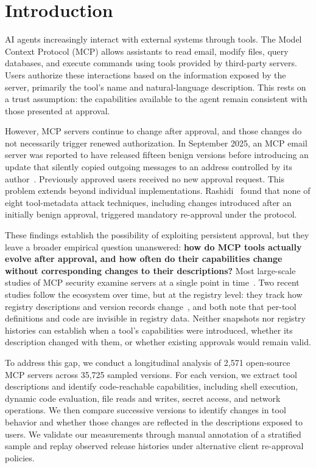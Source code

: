 \section{Introduction}\label{sec:intro}

AI agents increasingly interact with external systems through tools. The Model Context Protocol (MCP) allows assistants to read email, modify files, query databases, and execute commands using tools provided by third-party servers. Users authorize these interactions based on the information exposed by the server, primarily the tool's name and natural-language description. This rests on a trust assumption: the capabilities available to the agent remain consistent with those presented at approval.

However, MCP servers continue to change after approval, and those changes do not necessarily trigger renewed authorization. In September 2025, an MCP email server was reported to have released fifteen benign versions before introducing an update that silently copied outgoing messages to an address controlled by its author~\cite{koi2025postmark}. Previously approved users received no new approval request. This problem extends beyond individual implementations. Rashidi~\cite{unicodetag2026} found that none of eight tool-metadata attack techniques, including changes introduced after an initially benign approval, triggered mandatory re-approval under the protocol.

These findings establish the possibility of exploiting persistent approval, but they leave a broader empirical question unanswered: \textbf{how do MCP tools actually evolve after approval, and how often do their capabilities change without corresponding changes to their descriptions?} Most large-scale studies of MCP security examine servers at a single point in time~\cite{dcichecker2026,mcpdiff2026,mcpfsd2026,mcpzoo2026}. Two recent studies follow the ecosystem over time, but at the registry level: they track how registry descriptions and version records change~\cite{bharti2026registry,kraishan2026samename}, and both note that per-tool definitions and code are invisible in registry data. Neither snapshots nor registry histories can establish when a tool's capabilities were introduced, whether its description changed with them, or whether existing approvals would remain valid.

To address this gap, we conduct a longitudinal analysis of 2,571 open-source MCP servers across 35,725 sampled versions. For each version, we extract tool descriptions and identify code-reachable capabilities, including shell execution, dynamic code evaluation, file reads and writes, secret access, and network operations. We then compare successive versions to identify changes in tool behavior and whether those changes are reflected in the descriptions exposed to users. We validate our measurements through manual annotation of a stratified sample and replay observed release histories under alternative client re-approval policies.

